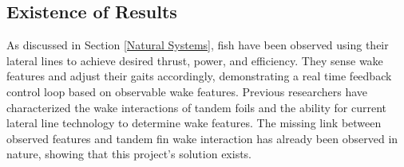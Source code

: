 \subsection{Existence of Results}
    As discussed in Section \ref{Natural Systems}, fish have been observed using their lateral lines to achieve desired thrust, power, and efficiency. They sense wake features and adjust their gaits accordingly, demonstrating a real time feedback control loop based on observable wake features. Previous researchers have characterized the wake interactions of tandem foils and the ability for current lateral line technology to determine wake features. The missing link between observed features and tandem fin wake interaction has already been observed in nature, showing that this project's solution exists.